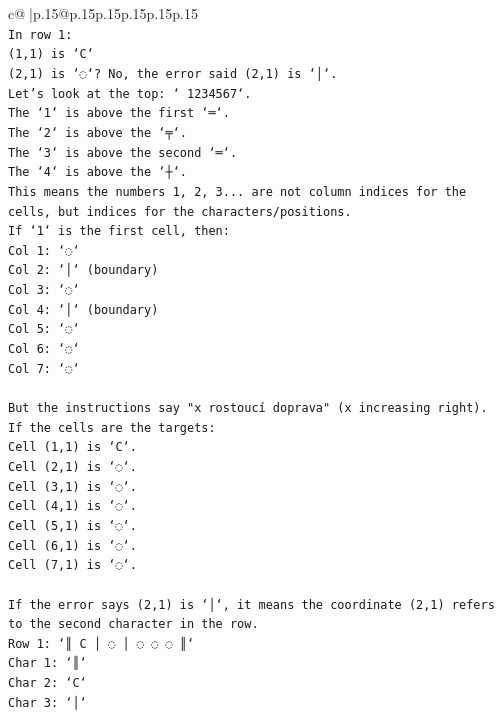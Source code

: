 \documentclass{article}
\begin{document}
{\begin{supertabular}{c@{$\;$}|p{.15\linewidth}@{}p{.15\linewidth}p{.15\linewidth}p{.15\linewidth}p{.15\linewidth}p{.15\linewidth}}
{{{\\ 
\texttt{In row 1:} \\
\texttt{(1,1) is `C`} \\
\texttt{(2,1) is `◌`? No, the error said (2,1) is `│`.} \\
\texttt{Let's look at the top: ` 1234567`.} \\
\texttt{The `1` is above the first `═`.} \\
\texttt{The `2` is above the `╤`.} \\
\texttt{The `3` is above the second `═`.} \\
\texttt{The `4` is above the `┼`.} \\
\texttt{This means the numbers 1, 2, 3... are not column indices for the cells, but indices for the characters/positions.} \\
\texttt{If `1` is the first cell, then:} \\
\texttt{Col 1: `◌`} \\
\texttt{Col 2: `│` (boundary)} \\
\texttt{Col 3: `◌`} \\
\texttt{Col 4: `│` (boundary)} \\
\texttt{Col 5: `◌`} \\
\texttt{Col 6: `◌`} \\
\texttt{Col 7: `◌`} \\
\\ 
\texttt{But the instructions say "x rostoucí doprava" (x increasing right).} \\
\texttt{If the cells are the targets:} \\
\texttt{Cell (1,1) is `C`.} \\
\texttt{Cell (2,1) is `◌`.} \\
\texttt{Cell (3,1) is `◌`.} \\
\texttt{Cell (4,1) is `◌`.} \\
\texttt{Cell (5,1) is `◌`.} \\
\texttt{Cell (6,1) is `◌`.} \\
\texttt{Cell (7,1) is `◌`.} \\
\\ 
\texttt{If the error says (2,1) is `│`, it means the coordinate (2,1) refers to the second character in the row.} \\
\texttt{Row 1: `║ C │ ◌ │ ◌ ◌ ◌ ║`} \\
\texttt{Char 1: `║`} \\
\texttt{Char 2: `C`} \\
\texttt{Char 3: `│`} \\
}}}
\end{supertabular}}
\end{document}
